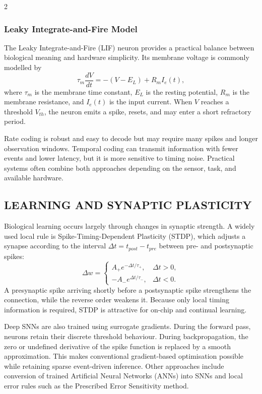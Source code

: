 \begin{multicols}{2}
  \subsubsection*{Leaky Integrate-and-Fire Model}
  The Leaky Integrate-and-Fire (LIF) neuron provides a practical balance between biological meaning and hardware simplicity. Its membrane voltage is commonly modelled by
  \[
    \tau_m\frac{dV}{dt}=-(V-E_L)+R_m I_e(t),
  \]
  where $\tau_m$ is the membrane time constant, $E_L$ is the resting potential, $R_m$ is the membrane resistance, and $I_e(t)$ is the input current. When $V$ reaches a threshold $V_{th}$, the neuron emits a spike, resets, and may enter a short refractory period.

  \begin{center}
\begin{minipage}{0.98\columnwidth}
\centering
    \arjunLIFFigure
\end{minipage}
  \end{center}

  Rate coding is robust and easy to decode but may require many spikes and longer observation windows. Temporal coding can transmit information with fewer events and lower latency, but it is more sensitive to timing noise. Practical systems often combine both approaches depending on the sensor, task, and available hardware.

  \subsection*{\centering\uppercase{Learning and Synaptic Plasticity}}
  Biological learning occurs largely through changes in synaptic strength. A widely used local rule is Spike-Timing-Dependent Plasticity (STDP), which adjusts a synapse according to the interval $\Delta t=t_{post}-t_{pre}$ between pre- and postsynaptic spikes:
  \[
    \Delta w=
    \begin{cases}
      A_+e^{-\Delta t/\tau_+}, & \Delta t>0,\\
      -A_-e^{\Delta t/\tau_-}, & \Delta t<0.
    \end{cases}
  \]
  A presynaptic spike arriving shortly before a postsynaptic spike strengthens the connection, while the reverse order weakens it. Because only local timing information is required, STDP is attractive for on-chip and continual learning.

  \noindent
  Deep SNNs are also trained using surrogate gradients. During the forward pass, neurons retain their discrete threshold behaviour. During backpropagation, the zero or undefined derivative of the spike function is replaced by a smooth approximation. This makes conventional gradient-based optimisation possible while retaining sparse event-driven inference. Other approaches include conversion of trained Artificial Neural Networks (ANNs) into SNNs and local error rules such as the Prescribed Error Sensitivity method.


\end{multicols}
